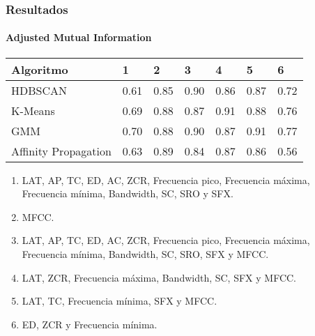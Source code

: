 \begin{frame}
    \frametitle{Resultados}
    \framesubtitle{Adjusted Mutual Information}

    \begin{table}[H]
        \centering
        \begin{tabular}{lllllll}
            \hline
            Algoritmo & 1 & 2 & 3 & 4 & 5 & 6  \\ \hline
            HDBSCAN & 0.61 & 0.85 & 0.90 & 0.86 & 0.87 & 0.72 \\
            K-Means & 0.69 & 0.88 & 0.87 & \cellcolor[HTML]{FFFC9E}0.91 & 0.88 & 0.76 \\
            GMM & 0.70 & 0.88 & 0.90 & 0.87 & \cellcolor[HTML]{FFFC9E}0.91 & 0.77 \\
            Affinity Propagation & 0.63 & 0.89 & 0.84 & 0.87 & 0.86 & 0.56
        \end{tabular}
    \end{table}

    {\tiny
    \begin{enumerate}
        \item LAT, AP, TC, ED, AC, ZCR, Frecuencia pico, Frecuencia máxima, Frecuencia mínima, Bandwidth, SC, SRO y SFX\@. %
        \item MFCC\@. %
        \item LAT, AP, TC, ED, AC, ZCR, Frecuencia pico, Frecuencia máxima, Frecuencia mínima, Bandwidth, SC, SRO, SFX y MFCC\@.
        \item LAT, ZCR, Frecuencia máxima, Bandwidth, SC, SFX y MFCC\@. %
        \item LAT, TC, Frecuencia mínima, SFX y MFCC\@. %
        \item ED, ZCR y Frecuencia mínima.
    \end{enumerate}
    }

\end{frame}
